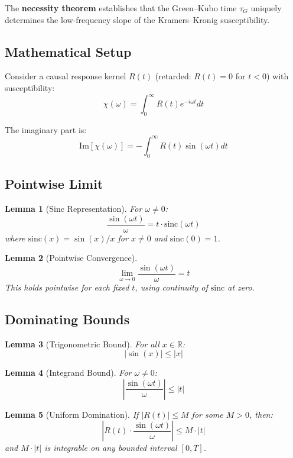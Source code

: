 \documentclass[11pt]{article}
\newtheorem{lemma}{Lemma}
\begin{document}
The \textbf{necessity theorem} establishes that the Green--Kubo time $\tau_G$ uniquely determines the low-frequency slope of the Kramers--Kronig susceptibility.

\subsection{Mathematical Setup}

Consider a causal response kernel $R(t)$ (retarded: $R(t) = 0$ for $t < 0$) with susceptibility:
\[
\chi(\omega) = \int_0^\infty R(t) e^{-i\omega t} dt
\]

The imaginary part is:
\[
\text{Im}[\chi(\omega)] = -\int_0^\infty R(t) \sin(\omega t) dt
\]

\subsection{Pointwise Limit}

\begin{lemma}[Sinc Representation]
For $\omega \neq 0$:
\[
\frac{\sin(\omega t)}{\omega} = t \cdot \text{sinc}(\omega t)
\]
where $\text{sinc}(x) = \sin(x)/x$ for $x \neq 0$ and $\text{sinc}(0) = 1$.
\end{lemma}

\begin{lemma}[Pointwise Convergence]
\[
\lim_{\omega \to 0} \frac{\sin(\omega t)}{\omega} = t
\]
This holds pointwise for each fixed $t$, using continuity of $\text{sinc}$ at zero.
\end{lemma}

\subsection{Dominating Bounds}

\begin{lemma}[Trigonometric Bound]
For all $x \in \mathbb{R}$:
\[
|\sin(x)| \leq |x|
\]
\end{lemma}

\begin{lemma}[Integrand Bound]
For $\omega \neq 0$:
\[
\left|\frac{\sin(\omega t)}{\omega}\right| \leq |t|
\]
\end{lemma}

\begin{lemma}[Uniform Domination]
If $|R(t)| \leq M$ for some $M > 0$, then:
\[
\left|R(t) \cdot \frac{\sin(\omega t)}{\omega}\right| \leq M \cdot |t|
\]
and $M \cdot |t|$ is integrable on any bounded interval $[0, T]$.
\end{lemma}
\end{document}
